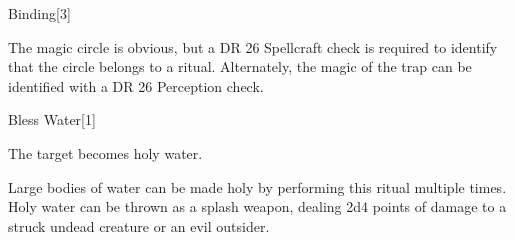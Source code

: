 \begin{spellsection}{Binding}[3]
\begin{spellfooter}
        The magic circle is obvious, but a DR 26 Spellcraft check is required to identify that the circle belongs to a  ritual. Alternately, the magic of the trap can be identified with a DR 26 Perception check.
    \end{spellfooter}
    \begin{spellaugments}
    \end{spellaugments}
\end{spellsection}

\begin{spellsection}{Bless Water}[1]
    \begin{spellheader}
    \end{spellheader}
    \begin{spellcontent}
        \begin{spelltargetinginfo}
        \end{spelltargetinginfo}
        \begin{spelleffects}
            \spelleffect The target becomes holy water.
        \end{spelleffects}
    \end{spellcontent}
    \begin{spellfooter}
        \spellnotes Large bodies of water can be made holy by performing this ritual multiple times. Holy water can be thrown as a splash weapon, dealing 2d4 points of damage to a struck undead creature or an evil outsider.
    \end{spellfooter}
\end{spellsection}

